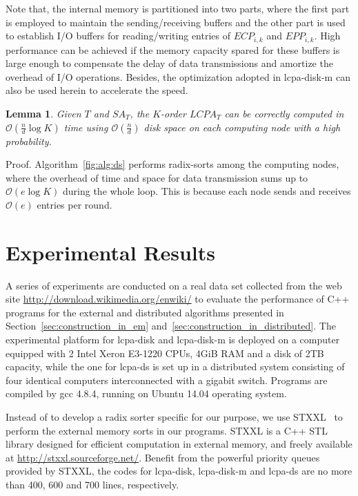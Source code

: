\documentclass[article]{IEEEtran}
\newtheorem{lem}[thm]{Lemma}
\theoremstyle{definition}
\theoremstyle{remark}
\numberwithin{equation}{section}
\begin{document}
Note that, the internal memory is partitioned into two parts, where the first part is employed to maintain the sending/receiving buffers and the other part is used to establish I/O buffers for reading/writing entries of $ECP_{i,k}$ and $EPP_{i,k}$. High performance can be achieved if the memory capacity spared for these buffers is large enough to compensate the delay of data transmissions and amortize the overhead of I/O operations. Besides, the optimization adopted in lcpa-disk-m can also be used herein to accelerate the speed.

\begin{lem}
\label{thm:lcp:pdm}
Given $T$ and $SA_T$, the $K$-order $LCPA_T$ can be correctly computed in $\mathcal{O}(\frac{n}{d}\log K)$ time using $\mathcal{O}(\frac{n}{d})$ disk space on each computing node with a high probability.
\end{lem}
Proof. Algorithm~\ref{fig:alg:ds} performs radix-sorts among the computing nodes, where the overhead of time and space for data transmission sums up to $\mathcal{O}(e\log K)$ during the whole loop. This is because each node sends and receives $\mathcal{O}(e)$ entries per round.



\section{Experimental Results}\label{sec:experimental_results}

A series of experiments are conducted on a real data set collected from the web site \url{http://download.wikimedia.org/enwiki/} to evaluate the performance of {C++} programs for the external and distributed algorithms presented in Section~\ref{sec:construction_in_em} and~\ref{sec:construction_in_distributed}. The experimental platform for lcpa-disk and lcpa-disk-m is deployed on a computer equipped with 2 Intel Xeron E3-1220 CPUs, 4GiB RAM and a disk of 2TB capacity, while the one for lcpa-ds is set up in a distributed system consisting of four identical computers interconnected with a gigabit switch. Programs are compiled by gcc 4.8.4, running on Ubuntu 14.04 operating system.

Instead of to develop a radix sorter specific for our purpose, we use STXXL~\cite{Dementiev2007} to perform the external memory sorts in our programs. STXXL is a {C++} STL library designed for efficient computation in external memory, and freely available at \url{http://stxxl.sourceforge.net/}. Benefit from the powerful priority queues provided by STXXL, the codes for lcpa-disk, lcpa-disk-m and lcpa-ds are no more than 400, 600 and 700 lines, respectively.
\end{document}

